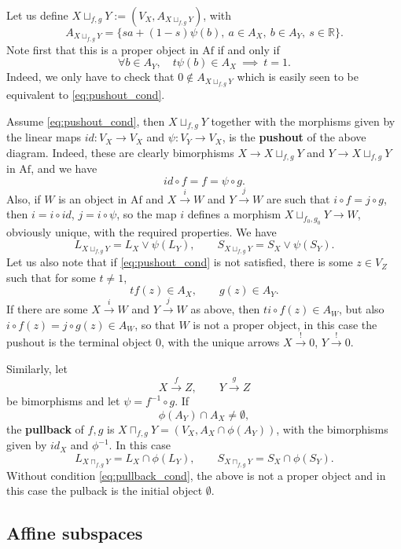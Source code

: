 \documentclass[12pt]{article}
\theoremstyle{definition}
\theoremstyle{remark}
\def \Af{\mathrm{Af}}
\begin{document}
Let us define  $X\sqcup_{f,g} Y:=(V_X,A_{X\sqcup_{f,g} Y})$, with 
\[
A_{X\sqcup_{f,g} Y}=\{sa+(1-s)\psi(b),\ a\in A_X,\ b\in A_Y,\ s\in \mathbb R\}.
\]
Note first that this is a proper object in $\Af$ if and only if 
\begin{equation}\label{eq:pushout_cond}
\forall b\in A_Y,\quad t\psi(b)\in A_X \ \implies \ t=1.
\end{equation}
Indeed, we only have to check that
$0\notin A_{X\sqcup_{f,g}Y}$ which is easily seen to be equivalent to
\eqref{eq:pushout_cond}. 

Assume \eqref{eq:pushout_cond}, then $X\sqcup_{f,g} Y$ together with the morphisms given by the linear maps
$id:V_X\to V_X$ and $\psi:V_Y\to V_X$,  is the \textbf{pushout} of the above diagram. Indeed, these are clearly bimorphisms $X\to X\sqcup_{f,g} Y$ and $Y\to X\sqcup_{f,g} Y$ in $\Af$, and we have 
\[
id\circ f=f=\psi\circ g.
\]
Also, if  $W$ is an object in $\Af$ and $X\xrightarrow{i} W$ and $Y\xrightarrow{j} W$ are such that $i\circ f=j\circ
g$, then $i=i\circ id$, $j=i\circ \psi$, so the map $i$ defines a morphism
$X\sqcup_{f_0,g_0} Y\to W$,
obviously unique, with the required properties. We have
\[
L_{X\sqcup_{f,g}Y}=L_X\vee \psi(L_Y),\qquad S_{X\sqcup_{f,g}Y}=S_X\vee
\psi(S_Y).
\]
Let us also note that if \eqref{eq:pushout_cond} is not satisfied,  there is some $z\in V_Z$ such
that for some $t\ne 1$,
\[
tf(z)\in A_X,\qquad g(z)\in A_Y.
\]
If there are some $X\xrightarrow{i} W$ and $Y\xrightarrow{j} W$ as above, then 
$ti\circ f(z)\in A_W$, but also $i\circ f(z)=j\circ g(z)\in A_W$, so that $W$ is not a
proper object, in this case the pushout is the terminal object $0$, with the unique arrows
$X\xrightarrow{!} 0$, $Y\xrightarrow{!} 0$.

Similarly, let 
\[
X\xrightarrow{f} Z,\qquad Y\xrightarrow{g} Z
\]
be  bimorphisms and let $\psi=f^{-1}\circ g$. If 
\begin{equation}\label{eq:pullback_cond}
\phi(A_Y)\cap A_X\ne \emptyset,
\end{equation}
 the \textbf{pullback} of $f, g$ is
$X\sqcap_{f,g}Y=(V_X, A_X\cap \phi(A_Y))$, 
with  the bimorphisms given by $id_X$ and $\phi^{-1}$. In this case
\[
L_{X\sqcap_{f,g}Y}=L_X\cap \phi(L_Y),\qquad S_{X\sqcap_{f,g}Y}=S_X\cap \phi(S_Y).
\]
Without  condition \eqref{eq:pullback_cond}, the above is not a proper object and in 
this case the pulback is the initial object $\emptyset$.



\appendix

\subsection{Affine subspaces}
\end{document}
